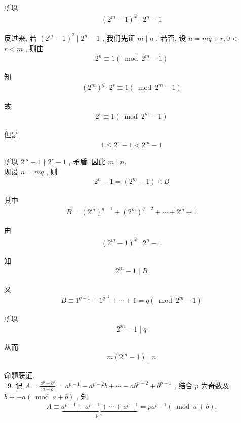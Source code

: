 所以
\begin{align*}
	\left(2^{m}-1\right)^{2} \mid 2^{n}-1
\end{align*}

反过来, 若 $\left(2^{m}-1\right)^{2} \mid 2^{n}-1$ , 我们先证 $m \mid n$ . 若否, 设 $n=m q+r, 0<$ $r<m$ , 则由
\begin{align*}
	2^{n} \equiv 1\left(\bmod 2^{m}-1\right)
\end{align*}

知
\begin{align*}
	\left(2^{m}\right)^{q} \cdot 2^{r} \equiv 1\left(\bmod 2^{m}-1\right)
\end{align*}

故
\begin{align*}
	2^{r} \equiv 1\left(\bmod 2^{m}-1\right)
\end{align*}

但是
\begin{align*}
	1 \leqslant 2^{r}-1<2^{m}-1
\end{align*}

所以 $2^{m}-1 \nmid 2^{r}-1$ , 矛盾. 因此 $m \mid n$.\\
现设 $n=m q$ , 则
\begin{align*}
	2^{n}-1=\left(2^{m}-1\right) \times B
\end{align*}

其中
\begin{align*}
	B=\left(2^{m}\right)^{q-1}+\left(2^{m}\right)^{q-2}+\cdots+2^{m}+1
\end{align*}

由
\begin{align*}
	\left(2^{m}-1\right)^{2} \mid 2^{n}-1
\end{align*}

知
\begin{align*}
	2^{m}-1 \mid B
\end{align*}

又
\begin{align*}
	B \equiv 1^{q-1}+1^{q^{-2}}+\cdots+1=q\left(\bmod 2^{m}-1\right)
\end{align*}

所以
\begin{align*}
	2^{m}-1 \mid q
\end{align*}

从而
\begin{align*}
	m\left(2^{m}-1\right) \mid n
\end{align*}

命题获证.\\
19. 记 $A=\frac{a^{p}+b^{p}}{a+b}=a^{p-1}-a^{p-2} b+\cdots-a b^{p-2}+b^{p-1}$ , 结合 $p$ 为奇数及 $b \equiv-a(\bmod a+b)$ , 知
\begin{align*}
	A \equiv \underbrace{a^{p-1}+a^{p-1}+\cdots+a^{p-1}}_{p \uparrow}=p a^{p-1}(\bmod a+b) .
\end{align*}

